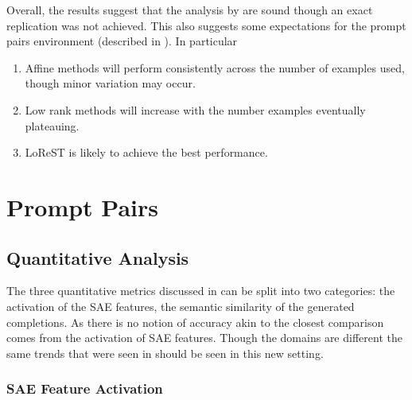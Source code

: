 Overall, the results suggest that the analysis by \citet{steering-clear} are sound though an exact replication was not achieved.
This also suggests some expectations for the prompt pairs environment (described in ).
In particular
\begin{enumerate}[nolistsep]
    \item Affine methods will perform consistently across the number of examples used, though minor variation may occur.
    \item Low rank methods will increase with the number examples eventually plateauing.
    \item LoReST is likely to achieve the best performance.
\end{enumerate}

\section{Prompt Pairs}
\label{sec:prompt-pairs-res}

\subsection{Quantitative Analysis}

The three quantitative metrics discussed in  can be split into two categories: the activation of the SAE features, the semantic similarity of the generated completions.
As there is no notion of accuracy akin to \citet{steering-clear} the closest comparison comes from the activation of SAE features.
Though the domains are different the same trends that were seen in  should be seen in this new setting.

\subsubsection{SAE Feature Activation}

